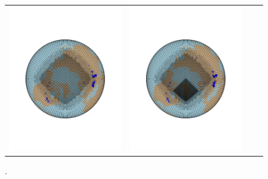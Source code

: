 \documentclass[draft]{agujournal2019}
\begin{document}
\begin{figure}[t]
\begin{center}
\begin{tabular}{cccc}
         \includegraphics[width=60mm]{figs/grid-ARCTIC.pdf}&
         \includegraphics[width=60mm]{figs/grid-ARCTICGRIS.pdf} \\
\end{tabular}
\end{center}
\caption{.}
\label{fig:vr-grids}
\end{figure}
\end{document}
